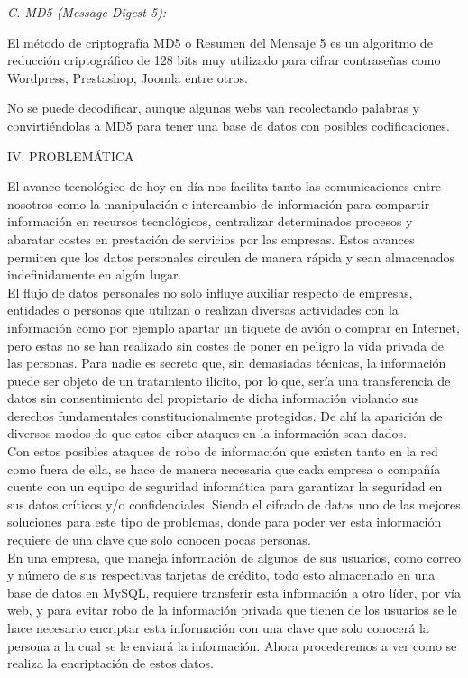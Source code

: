 \documentclass[9pt,24pt,twocolumn]{article}
\begin{document}
\textit{C. MD5 (Message Digest 5):}

{El método de criptografía MD5 o Resumen del Mensaje 5 es un algoritmo de reducción criptográfico de 128 bits muy utilizado para cifrar contraseñas como Wordpress, Prestashop, Joomla entre otros.}

{No se puede decodificar, aunque algunas webs van recolectando palabras y convirtiéndolas a MD5 para tener una base de datos con posibles codificaciones.}
\\


\begin{center}
{IV.  PROBLEMÁTICA}
\end{center}

{El avance tecnológico de hoy en día nos facilita tanto las comunicaciones entre nosotros como la manipulación e intercambio de información para compartir información en recursos tecnológicos, centralizar determinados procesos y abaratar costes en prestación de servicios por las empresas. Estos avances permiten que los datos personales circulen de manera rápida y sean almacenados indefinidamente en algún lugar.}
\\

{El flujo de datos personales no solo influye auxiliar respecto de empresas, entidades o personas que utilizan o realizan diversas actividades con la información como por ejemplo apartar un tiquete de avión o comprar en Internet, pero estas no se han realizado sin costes de poner en peligro la vida privada de las personas. Para nadie es secreto que, sin demasiadas técnicas, la información puede ser objeto de un tratamiento ilícito, por lo que, sería una transferencia de datos sin consentimiento del propietario de dicha información violando sus derechos fundamentales constitucionalmente protegidos. De ahí la aparición de diversos modos de que estos ciber-ataques en la información sean dados.}
\\

{Con estos posibles ataques de robo de información que existen tanto en la red como fuera de ella, se hace de manera necesaria que cada empresa o compañía cuente con un equipo de seguridad informática para garantizar la seguridad en sus datos críticos y/o confidenciales. Siendo el cifrado de datos uno de las mejores soluciones para este tipo de problemas, donde para poder ver esta información requiere de una clave que solo conocen pocas personas.}
\\

{En una empresa, que maneja información de algunos de sus usuarios, como correo y número de sus respectivas tarjetas de crédito, todo esto almacenado en una base de datos en MySQL, requiere transferir esta información a otro líder, por vía web, y para evitar robo de la información privada que tienen de los usuarios se le hace necesario encriptar esta información con una clave que solo conocerá la persona a la cual se le enviará la información. Ahora procederemos a ver como se realiza la encriptación de estos datos.}
\\
\end{document}
